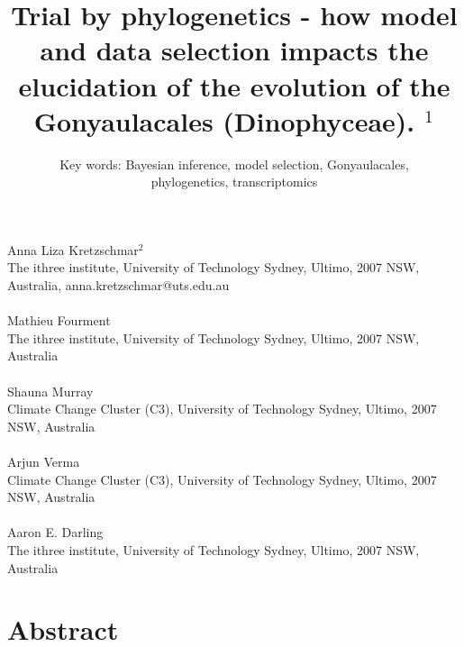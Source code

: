 \documentclass[12pt]{article}
\title{Trial by phylogenetics - how model and data selection impacts the elucidation of the evolution of the Gonyaulacales (Dinophyceae). $^{1}$}
\author{Key words: Bayesian inference, model selection, Gonyaulacales,\\ phylogenetics, transcriptomics}
\date{}
\begin{document}
\maketitle


\paragraph{}Anna Liza Kretzschmar$^{2}$\\
The ithree institute, University of Technology Sydney, Ultimo, 2007 NSW, Australia, anna.kretzschmar@uts.edu.au
\paragraph{}Mathieu Fourment \\
The ithree institute, University of Technology Sydney, Ultimo, 2007 NSW, Australia
\paragraph{}Shauna Murray\\ 
Climate Change Cluster (C3), University of Technology Sydney, Ultimo, 2007 NSW, Australia
\paragraph{}Arjun Verma\\
Climate Change Cluster (C3), University of Technology Sydney, Ultimo, 2007 NSW, Australia
\paragraph{}Aaron E. Darling \\
The ithree institute, University of Technology Sydney, Ultimo, 2007 NSW, Australia
\newpage
\section{Abstract}
\newpage

\end{document}
